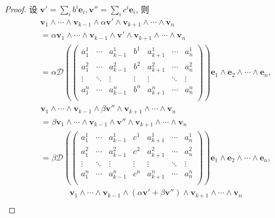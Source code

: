 \documentclass{ctexart}
\begin{document}
\begin{proof}
    设 $\boldsymbol{v}'=\sum\limits_{i}b^i\boldsymbol{e}_i,\boldsymbol{v}''=\sum\limits_{i}c^i\boldsymbol{e}_i$, 则
    \begin{align*}
        & \boldsymbol{v}_1\wedge\cdots\wedge\boldsymbol{v}_{k-1}\wedge\alpha\boldsymbol{v}'\wedge\boldsymbol{v}_{k+1}\wedge\cdots\wedge\boldsymbol{v}_n \\
        & =\alpha\boldsymbol{v}_1\wedge\cdots\wedge\boldsymbol{v}_{k-1}\wedge\boldsymbol{v}'\wedge\boldsymbol{v}_{k+1}\wedge\cdots\wedge\boldsymbol{v}_n \\
        & =\alpha\mathcal{D}\left(\begin{pmatrix}
            a_1^1 & \cdots & a_{k-1}^1 & b^1 & a_{k+1}^1 & \cdots & a_n^1 \\
            a_1^2 & \cdots & a_{k-1}^2 & b^2 & a_{k+1}^2 & \cdots & a_n^2 \\
            \vdots & \ddots & \vdots & \vdots & \vdots & \ddots & \vdots \\
            a_1^n & \cdots & a_{k-1}^n & b^n & a_{k+1}^n & \cdots & a_n^n \\
        \end{pmatrix}\right)\boldsymbol{e}_1\wedge\boldsymbol{e}_2\wedge\cdots\wedge\boldsymbol{e}_n,
    \end{align*}
    \begin{align*}
        & \boldsymbol{v}_1\wedge\cdots\wedge\boldsymbol{v}_{k-1}\wedge\beta\boldsymbol{v}''\wedge\boldsymbol{v}_{k+1}\wedge\cdots\wedge\boldsymbol{v}_n \\
        & =\beta\boldsymbol{v}_1\wedge\cdots\wedge\boldsymbol{v}_{k-1}\wedge\boldsymbol{v}''\wedge\boldsymbol{v}_{k+1}\wedge\cdots\wedge\boldsymbol{v}_n \\
        & =\beta\mathcal{D}\left(\begin{pmatrix}
            a_1^1 & \cdots & a_{k-1}^1 & c^1 & a_{k+1}^1 & \cdots & a_n^1 \\
            a_1^2 & \cdots & a_{k-1}^2 & c^2 & a_{k+1}^2 & \cdots & a_n^2 \\
            \vdots & \ddots & \vdots & \vdots & \vdots & \ddots & \vdots \\
            a_1^n & \cdots & a_{k-1}^n & c^n & a_{k+1}^n & \cdots & a_n^n \\
        \end{pmatrix}\right)\boldsymbol{e}_1\wedge\boldsymbol{e}_2\wedge\cdots\wedge\boldsymbol{e}_n,
    \end{align*}
    \begin{align*}
        & \boldsymbol{v}_1\wedge\cdots\wedge\boldsymbol{v}_{k-1}\wedge(\alpha\boldsymbol{v}'+\beta\boldsymbol{v}'')\wedge\boldsymbol{v}_{k+1}\wedge\cdots\wedge\boldsymbol{v}_n \\

\end{align*}
\end{proof}
\end{document}
